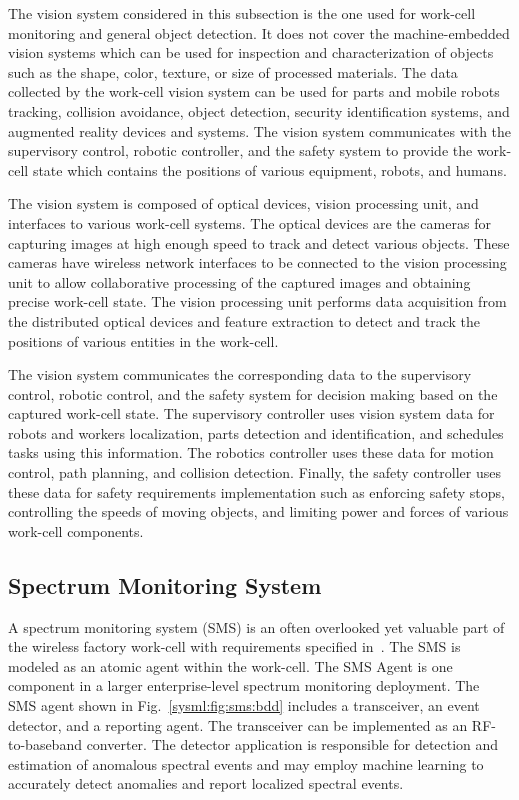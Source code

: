 The vision system considered in this subsection is the one used for work-cell monitoring and general object detection. It does not cover the machine-embedded vision systems which can be used for inspection and characterization of objects such as the shape, color, texture, or size of processed materials. The data collected by the work-cell vision system can be used for parts and mobile robots tracking, collision avoidance, object detection, security identification systems, and augmented reality devices and systems. The vision system communicates with the supervisory control, robotic controller, and the safety system to provide the work-cell state which contains the positions of various equipment, robots, and humans. 

The vision system is composed of optical devices, vision processing unit, and interfaces to various work-cell systems. The optical devices are the cameras for capturing images at high enough speed to track and detect various objects. These cameras have wireless network interfaces to be connected to the vision processing unit to allow collaborative processing of the captured images and obtaining precise work-cell state. The vision processing unit performs data acquisition from the distributed optical devices and feature extraction to detect and track the positions of various entities in the work-cell. 

The vision system communicates the corresponding data to the supervisory control, robotic control, and the safety system for decision making based on the captured work-cell state. The supervisory controller uses vision system data for robots and workers localization, parts detection and identification, and schedules tasks using this information. The robotics controller uses these data for motion control, path planning, and collision detection. Finally, the safety controller uses these data for safety requirements implementation such as enforcing safety stops, controlling the speeds of moving objects, and limiting power and forces of various work-cell components.    

\subsection{Spectrum Monitoring System}\label{sysml:sec:sms}
A spectrum monitoring system (SMS) is an often overlooked yet valuable part of the wireless factory work-cell with requirements specified in~\cite{Candell2017.SMS}.  The SMS is modeled as an atomic agent within the work-cell.  The SMS Agent is one component in a larger enterprise-level spectrum monitoring deployment.  The SMS agent shown in Fig.~\ref{sysml:fig:sms:bdd} includes a transceiver, an event detector, and a reporting agent.  The transceiver can be implemented as an RF-to-baseband converter.  The detector application is responsible for detection and estimation of anomalous spectral events and may employ machine learning to accurately detect anomalies and report localized spectral events.

